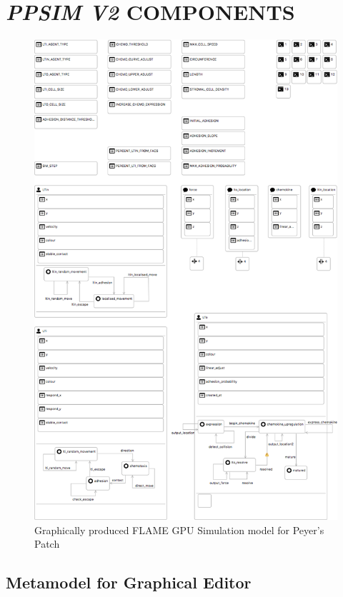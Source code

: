 \documentclass{UoYCSproject}
\begin{document}
\printbibliography

\appendix
\chapter{\textit{PPSIM V2} COMPONENTS}

\begin{figure}[htp]
\centering
\includegraphics[width=\textwidth]{Appendix/ppsim_gmf}
\caption{Graphically produced \gls{FLAME GPU} Simulation model for Peyer's Patch}
\label{fig:ppsim_gmf}
\end{figure}

\newpage

\section{Metamodel for Graphical Editor}
\label{fig:gmf_metamodel}

\end{document}
